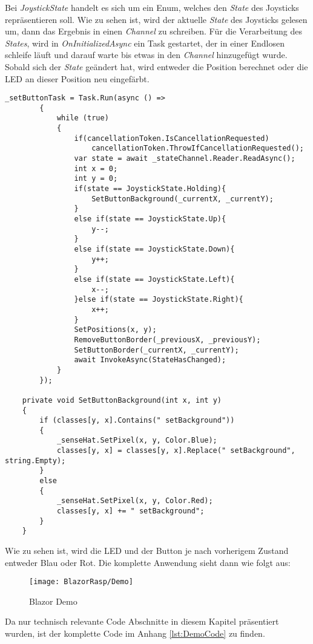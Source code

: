 Bei \emph{JoystickState} handelt es sich um ein Enum, welches den \emph{State} des Joysticks
repräsentieren soll. Wie zu sehen ist, wird der aktuelle \emph{State} des Joysticks gelesen um,
dann das Ergebnis in einen \emph{Channel} zu schreiben.
\newline
\newline
Für die Verarbeitung des \emph{States}, wird in \emph{OnInitializedAsync} ein Task gestartet, der
in einer Endlosen schleife läuft und darauf warte bis etwas in den \emph{Channel} hinzugefügt
wurde. Sobald sich der \emph{State} geändert hat, wird entweder die Position berechnet oder
die LED an dieser Position neu eingefärbt.

\begin{lstlisting}[language={[Sharp]C}, caption=Task zum Verarbeiten des States,
    label=lst:StateTask]
        _setButtonTask = Task.Run(async () =>
        {
            while (true)
            {
                if(cancellationToken.IsCancellationRequested)
                    cancellationToken.ThrowIfCancellationRequested();
                var state = await _stateChannel.Reader.ReadAsync();
                int x = 0;
                int y = 0;
                if(state == JoystickState.Holding){
                    SetButtonBackground(_currentX, _currentY);
                }
                else if(state == JoystickState.Up){
                    y--;
                }
                else if(state == JoystickState.Down){
                    y++;
                }
                else if(state == JoystickState.Left){
                    x--;
                }else if(state == JoystickState.Right){
                    x++;
                }
                SetPositions(x, y);
                RemoveButtonBorder(_previousX, _previousY);
                SetButtonBorder(_currentX, _currentY);
                await InvokeAsync(StateHasChanged);
            }
        });

    private void SetButtonBackground(int x, int y)
    {
        if (classes[y, x].Contains(" setBackground"))
        {
            _senseHat.SetPixel(x, y, Color.Blue);
            classes[y, x] = classes[y, x].Replace(" setBackground", string.Empty);
        }
        else
        {
            _senseHat.SetPixel(x, y, Color.Red);
            classes[y, x] += " setBackground";
        }
    }
\end{lstlisting}

Wie zu sehen ist, wird die LED und der Button je
nach vorherigem Zustand entweder Blau oder Rot. Die komplette Anwendung sieht dann wie folgt aus:

\begin{figure}[h]
    \centering
    \texttt{[image: BlazorRasp/Demo]}
    \caption[Blazor Demo]{Blazor Demo}
    \label{img:BlazorDatenAnzeigen}
\end{figure}

Da nur technisch relevante Code Abschnitte in diesem Kapitel präsentiert wurden, ist der
komplette Code im Anhang \ref{lst:DemoCode} zu finden.